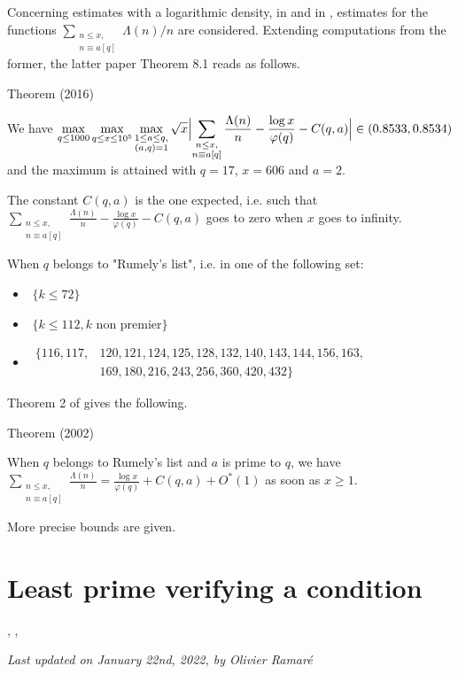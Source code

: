 \par 
Concerning estimates with a logarithmic density, in
\cite{Ramare*02}
and in
\cite{Ramare*12-0},
estimates for the functions
$\displaystyle\sum_{\substack{n\le x,\\ n\equiv a[q]}}\Lambda(n)/n$
are considered.
Extending computations from the former, the latter paper Theorem 8.1
reads as follows.
\begin{thm}{Theorem (2016)}

  We have
  $\displaystyle
  \max_{q\le 1000}\max_{q\le x\le 10^5}\max_{\substack{1\le a\le q,\\
  (a,q)=1}}
  \sqrt{x}\Bigl|
  \sum_{\substack{n\le x,\\ n\equiv a[q]}}\frac{\Lambda(n)}{n}
  -\frac{\log x}{\varphi(q)}-C(q,a)\Bigr|\in(0.8533,0.8534)
  $
  and the maximum is attained with $q=17$, $x=606$ and $a=2$.
\end{thm}

The constant $C(q,a)$ is the one expected, i.e. such that
$\sum_{\substack{n\le x,\\ n\equiv a[q]}}\frac{\Lambda(n)}{n}
-\frac{\log x}{\varphi(q)}-C(q,a)$ goes to
zero when $x$ goes to infinity.

\par 
  When $q$ belongs to "Rumely's list", i.e. in one of the
following set:
\begin{itemize}
    \item \,\,$\{k\le 72\}$

    \item \,\,$\{k\le 112, \text{$k$ non premier}\}$

    \item \,$\begin{aligned}\{116, 117, &120, 121, 124, 125, 128, 132, 140,
     143, 144, 156, 163, \\ &169, 180, 216, 243, 256, 360, 420, 432\}\end{aligned}$

\end{itemize}
Theorem 2 of
\cite{Ramare*02}
gives the following.
\begin{thm}{Theorem (2002)}

  When $q$ belongs to Rumely's list and $a$ is prime to $q$, we have
  $\displaystyle
  \sum_{\substack{n\le x,\\ n\equiv a[q]}}\frac{\Lambda(n)}{n}
  =\frac{\log x}{\varphi(q)}+C(q,a)+O^*(1)
  $
  as soon as $x\ge1$.
\end{thm}

More precise bounds are given.




\section{Least prime verifying a condition}


\cite{Bach-Sorenson*96},
\cite{Kadiri*05-2},







  
\begin{flushright}\small\sl{}   Last updated on January 22nd, 2022, by Olivier Ramar\'e
 \end{flushright}
















